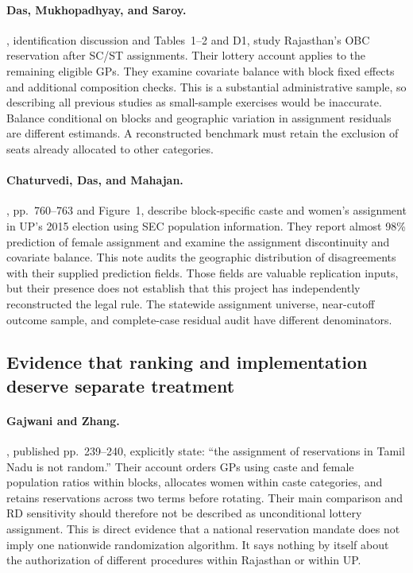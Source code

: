 \paragraph{Das, Mukhopadhyay, and Saroy.}
\citet{das2023}, identification discussion and Tables~1--2 and D1, study
Rajasthan's OBC reservation after SC/ST assignments. Their lottery account
applies to the remaining eligible GPs. They examine covariate balance with block
fixed effects and additional composition checks. This is a substantial
administrative sample, so describing all previous studies as small-sample
exercises would be inaccurate. Balance conditional on blocks and geographic
variation in assignment residuals are different estimands. A reconstructed
benchmark must retain the exclusion of seats already allocated to other
categories.

\paragraph{Chaturvedi, Das, and Mahajan.}
\citet{cdm2025}, pp.~760--763 and Figure~1, describe block-specific caste and
women's assignment in UP's 2015 election using SEC population information.
They report almost 98\% prediction of female assignment and examine the
assignment discontinuity and covariate balance. This note audits the geographic
distribution of disagreements with their supplied prediction fields. Those
fields are valuable replication inputs, but their presence does not establish
that this project has independently reconstructed the legal rule. The statewide
assignment universe, near-cutoff outcome sample, and complete-case residual
audit have different denominators.

\subsection{Evidence that ranking and implementation deserve separate treatment}

\paragraph{Gajwani and Zhang.}
\citet{gajwani2015}, published pp.~239--240, explicitly state: ``the assignment
of reservations in Tamil Nadu is not random.'' Their account orders GPs using
caste and female population ratios within blocks, allocates women within caste
categories, and retains reservations across two terms before rotating. Their
main comparison and RD sensitivity should therefore not be described as
unconditional lottery assignment. This is direct evidence that a national
reservation mandate does not imply one nationwide randomization algorithm.
It says nothing by itself about the authorization of different procedures
within Rajasthan or within UP.

